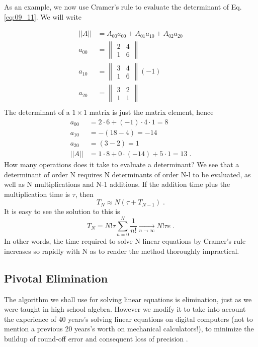 As an example, we now use Cramer's rule to evaluate the determinant of Eq. \ref{eq:09_11}. We will write

\begin{align*}
    ||A||&=A_{00}a_{00}+A_{01}a_{10}+   A_{02}a_{20}\\
    a_{00} &= 
    \begin{Vmatrix}
        2 & 4\\
        1 & 6
    \end{Vmatrix}\\
    a_{10} &= 
    \begin{Vmatrix}
        3 & 4\\
        1 & 6
    \end{Vmatrix} (-1)\\
    a_{20} &= 
    \begin{Vmatrix}
        3 & 2\\
        1 & 1
    \end{Vmatrix}\\
\end{align*}
The determinant of a $1 \times 1$ matrix is just the matrix element, hence
\begin{align*}
    a_{00} &=  2 \cdot 6 + (-1)\cdot 4\cdot 1 = 8\\
    a_{10} &=  -(18 - 4) = -14\\
    a_{20} &=  (3 -2) = 1\\
    ||A||&= 1\cdot 8 + 0\cdot (-14)+ 5\cdot 1 =13\;.
\end{align*}
How many operations does it take to evaluate a determinant? We
see that a determinant of order N requires N determinants of
order N-l to be evaluated, as well as N multiplications and N-1
additions. If the addition time plus the multiplication time is $\tau$,
then
\begin{equation*}
    T_N\approx N(\tau +T_{N-1})\;.
\end{equation*}
It is easy to see the solution to this is
\begin{equation*}
    T_N =N!\tau \sum_{n=0}^{N}\frac{1}{n!} \underset{n\to\infty}{\rightarrow} N!\tau e\;.
\end{equation*}
In other words, the time required to solve N linear equations by
Cramer's rule increases so rapidly with N as to render the method
thoroughly impractical.

\subsection{Pivotal Elimination}
The algorithm we shall use for solving linear equations is elimination, just as we were taught in high school algebra. However we
modify it to take into account the experience of 40 years's solving
linear equations on digital computers (not to mention a previous
20 years's worth on mechanical calculators!), to minimize the
buildup of round-off error and consequent loss of precision .


